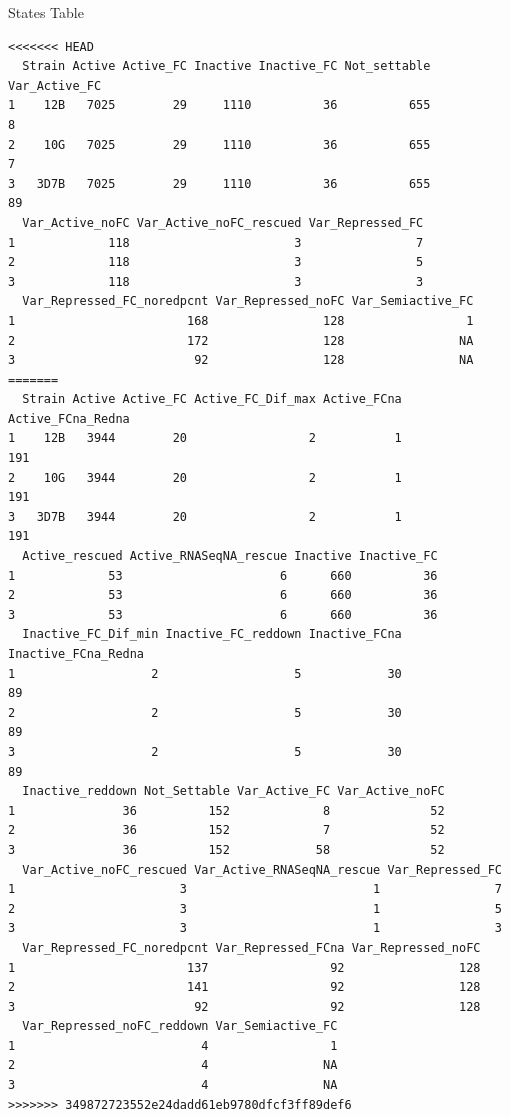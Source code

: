 \documentclass[11pt]{article}
\begin{document}
States Table
\begin{verbatim}
<<<<<<< HEAD
  Strain Active Active_FC Inactive Inactive_FC Not_settable Var_Active_FC
1    12B   7025        29     1110          36          655             8
2    10G   7025        29     1110          36          655             7
3   3D7B   7025        29     1110          36          655            89
  Var_Active_noFC Var_Active_noFC_rescued Var_Repressed_FC
1             118                       3                7
2             118                       3                5
3             118                       3                3
  Var_Repressed_FC_noredpcnt Var_Repressed_noFC Var_Semiactive_FC
1                        168                128                 1
2                        172                128                NA
3                         92                128                NA
=======
  Strain Active Active_FC Active_FC_Dif_max Active_FCna Active_FCna_Redna
1    12B   3944        20                 2           1               191
2    10G   3944        20                 2           1               191
3   3D7B   3944        20                 2           1               191
  Active_rescued Active_RNASeqNA_rescue Inactive Inactive_FC
1             53                      6      660          36
2             53                      6      660          36
3             53                      6      660          36
  Inactive_FC_Dif_min Inactive_FC_reddown Inactive_FCna Inactive_FCna_Redna
1                   2                   5            30                  89
2                   2                   5            30                  89
3                   2                   5            30                  89
  Inactive_reddown Not_Settable Var_Active_FC Var_Active_noFC
1               36          152             8              52
2               36          152             7              52
3               36          152            58              52
  Var_Active_noFC_rescued Var_Active_RNASeqNA_rescue Var_Repressed_FC
1                       3                          1                7
2                       3                          1                5
3                       3                          1                3
  Var_Repressed_FC_noredpcnt Var_Repressed_FCna Var_Repressed_noFC
1                        137                 92                128
2                        141                 92                128
3                         92                 92                128
  Var_Repressed_noFC_reddown Var_Semiactive_FC
1                          4                 1
2                          4                NA
3                          4                NA
>>>>>>> 349872723552e24dadd61eb9780dfcf3ff89def6
\end{verbatim}
\end{document}
